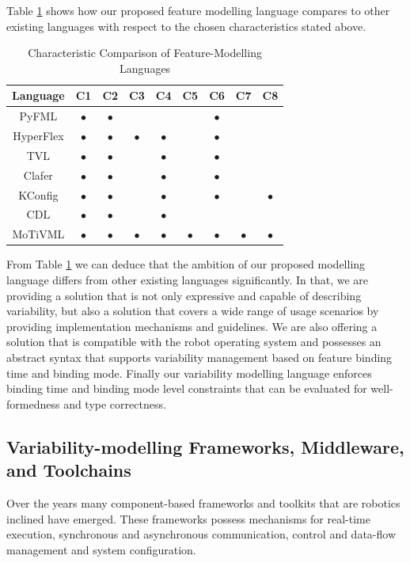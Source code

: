 \documentclass[conference]{IEEEtran}
\begin{document}
Table \ref{tab:compfml} shows how our proposed feature modelling language compares to other existing languages with respect to the chosen characteristics stated above.
\begin{table}[H]
\caption{Characteristic Comparison of Feature-Modelling Languages}
\begin{center}
\begin{tabular}{c c c c c c c c c}
\hline
    Language & C1 & C2 & C3 & C4 & C5 & C6 & C7 & C8 \\ \hline
    PyFML & $\bullet$ & $\bullet$ &  &  & & $\bullet$ & &\\\hline
    HyperFlex & $\bullet$ & $\bullet$ & $\bullet$ & $\bullet$ &  & $\bullet$ & &\\\hline
    TVL & $\bullet$ & $\bullet$ &  & $\bullet$ & & $\bullet$ & &\\ \hline
    Clafer & $\bullet$ & $\bullet$ &  & $\bullet$ &  & $\bullet$ & &\\ \hline
    KConfig & $\bullet$ & $\bullet$ & & $\bullet$ &  & $\bullet$ & & $\bullet$\\ \hline
    CDL & $\bullet$ & $\bullet$ &  &  $\bullet$ &  & & &\\ \hline
    MoTiVML & $\bullet$ & $\bullet$ & $\bullet$ & $\bullet$ & $\bullet$ & $\bullet$ & $\bullet$ & $\bullet$\\ \hline
\end{tabular}
\label{tab:compfml}
\end{center}
\end{table}

From Table \ref{tab:compfml} we can deduce that the ambition of our proposed modelling language differs from other existing languages significantly. In that, we are providing a solution that is not only expressive and capable of describing variability, but also a solution that covers a wide range of usage scenarios by providing implementation mechanisms and guidelines. We are also offering a solution that is compatible with the robot operating system and possesses an abstract syntax that supports variability management based on feature binding time and binding mode. Finally our variability modelling language enforces binding time and binding mode level constraints that can be evaluated for well-formedness and type correctness.

\subsection{Variability-modelling Frameworks, Middleware, and Toolchains}
Over the years many component-based frameworks and toolkits that are robotics inclined
have emerged. These frameworks possess mechanisms for real-time execution, synchronous and asynchronous communication, control and data-flow management and system configuration.
\end{document}
